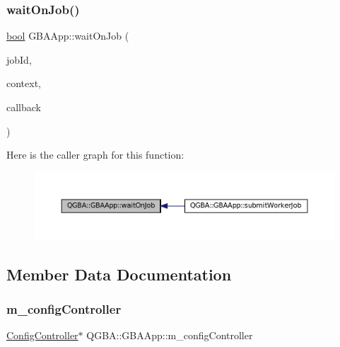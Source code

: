 \subsubsection{\texorpdfstring{wait\+On\+Job()}{waitOnJob()}}
{\footnotesize\ttfamily \mbox{\hyperlink{libretro_8h_a4a26dcae73fb7e1528214a068aca317e}{bool}} G\+B\+A\+App\+::wait\+On\+Job (\begin{DoxyParamCaption}\item[{qint64}]{job\+Id,  }\item[{Q\+Object $\ast$}]{context,  }\item[{std\+::function$<$ void()$>$}]{callback }\end{DoxyParamCaption})}

Here is the caller graph for this function\+:
\nopagebreak
\begin{figure}[H]
\begin{center}
\leavevmode
\includegraphics[width=350pt]{class_q_g_b_a_1_1_g_b_a_app_a7785f5a8ef24ecc09be362ce641f24dd_icgraph}
\end{center}
\end{figure}


\subsection{Member Data Documentation}
\mbox{\label{class_q_g_b_a_1_1_g_b_a_app_a954a4b4ec0817e60a5f63ab00f5ab4c4}} 
\subsubsection{\texorpdfstring{m\+\_\+config\+Controller}{m\_configController}}
{\footnotesize\ttfamily \mbox{\hyperlink{class_q_g_b_a_1_1_config_controller}{Config\+Controller}}$\ast$ Q\+G\+B\+A\+::\+G\+B\+A\+App\+::m\+\_\+config\+Controller\hspace{0.3cm}{\ttfamily [private]}}

